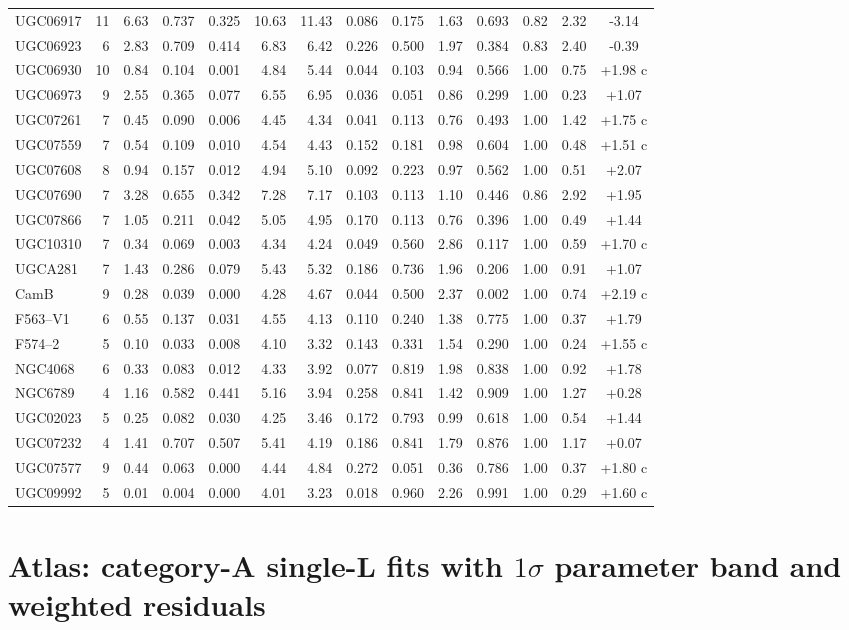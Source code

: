 \documentclass[10pt]{article}
\begin{document}
\begin{landscape}
{\begin{longtable}{lrrrrrrrrrrrrc}
UGC06917 & 11 & 6.63 & 0.737 & 0.325 & 10.63 & 11.43 & 0.086 & 0.175 & 1.63 & 0.693 & 0.82 & 2.32 & -3.14 \\
UGC06923 & 6 & 2.83 & 0.709 & 0.414 & 6.83 & 6.42 & 0.226 & 0.500 & 1.97 & 0.384 & 0.83 & 2.40 & -0.39 \\
UGC06930 & 10 & 0.84 & 0.104 & 0.001 & 4.84 & 5.44 & 0.044 & 0.103 & 0.94 & 0.566 & 1.00 & 0.75 & +1.98 c\\
UGC06973 & 9 & 2.55 & 0.365 & 0.077 & 6.55 & 6.95 & 0.036 & 0.051 & 0.86 & 0.299 & 1.00 & 0.23 & +1.07 \\
UGC07261 & 7 & 0.45 & 0.090 & 0.006 & 4.45 & 4.34 & 0.041 & 0.113 & 0.76 & 0.493 & 1.00 & 1.42 & +1.75 c\\
UGC07559 & 7 & 0.54 & 0.109 & 0.010 & 4.54 & 4.43 & 0.152 & 0.181 & 0.98 & 0.604 & 1.00 & 0.48 & +1.51 c\\
UGC07608 & 8 & 0.94 & 0.157 & 0.012 & 4.94 & 5.10 & 0.092 & 0.223 & 0.97 & 0.562 & 1.00 & 0.51 & +2.07 \\
UGC07690 & 7 & 3.28 & 0.655 & 0.342 & 7.28 & 7.17 & 0.103 & 0.113 & 1.10 & 0.446 & 0.86 & 2.92 & +1.95 \\
UGC07866 & 7 & 1.05 & 0.211 & 0.042 & 5.05 & 4.95 & 0.170 & 0.113 & 0.76 & 0.396 & 1.00 & 0.49 & +1.44 \\
UGC10310 & 7 & 0.34 & 0.069 & 0.003 & 4.34 & 4.24 & 0.049 & 0.560 & 2.86 & 0.117 & 1.00 & 0.59 & +1.70 c\\
UGCA281 & 7 & 1.43 & 0.286 & 0.079 & 5.43 & 5.32 & 0.186 & 0.736 & 1.96 & 0.206 & 1.00 & 0.91 & +1.07 \\
CamB & 9 & 0.28 & 0.039 & 0.000 & 4.28 & 4.67 & 0.044 & 0.500 & 2.37 & 0.002 & 1.00 & 0.74 & +2.19 c\\
F563--V1 & 6 & 0.55 & 0.137 & 0.031 & 4.55 & 4.13 & 0.110 & 0.240 & 1.38 & 0.775 & 1.00 & 0.37 & +1.79 \\
F574--2 & 5 & 0.10 & 0.033 & 0.008 & 4.10 & 3.32 & 0.143 & 0.331 & 1.54 & 0.290 & 1.00 & 0.24 & +1.55 c\\
NGC4068 & 6 & 0.33 & 0.083 & 0.012 & 4.33 & 3.92 & 0.077 & 0.819 & 1.98 & 0.838 & 1.00 & 0.92 & +1.78 \\
NGC6789 & 4 & 1.16 & 0.582 & 0.441 & 5.16 & 3.94 & 0.258 & 0.841 & 1.42 & 0.909 & 1.00 & 1.27 & +0.28 \\
UGC02023 & 5 & 0.25 & 0.082 & 0.030 & 4.25 & 3.46 & 0.172 & 0.793 & 0.99 & 0.618 & 1.00 & 0.54 & +1.44 \\
UGC07232 & 4 & 1.41 & 0.707 & 0.507 & 5.41 & 4.19 & 0.186 & 0.841 & 1.79 & 0.876 & 1.00 & 1.17 & +0.07 \\
UGC07577 & 9 & 0.44 & 0.063 & 0.000 & 4.44 & 4.84 & 0.272 & 0.051 & 0.36 & 0.786 & 1.00 & 0.37 & +1.80 c\\
UGC09992 & 5 & 0.01 & 0.004 & 0.000 & 4.01 & 3.23 & 0.018 & 0.960 & 2.26 & 0.991 & 1.00 & 0.29 & +1.60 c\\
\end{longtable}}\end{landscape}
\section*{Atlas: category-A single-L fits with $1\sigma$ parameter band and weighted residuals}
\end{document}
